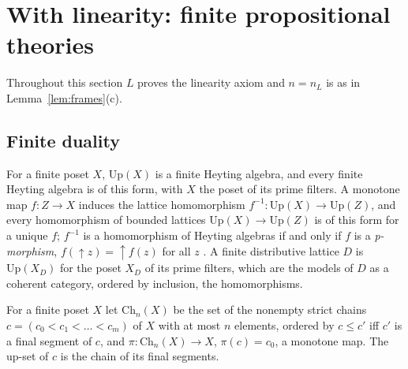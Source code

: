 \documentclass[11pt]{amsart}
\theoremstyle{definition}
\newcommand{\Up}{\mathrm{Up}}
\newcommand{\Ch}{\mathrm{Ch}}
\begin{document}
\section{With linearity: finite propositional theories}

Throughout this section $L$ proves the linearity axiom and $n=n_L$ is
as in Lemma~\ref{lem:frames}(c).

\subsection*{Finite duality}
For a finite poset $X$, $\Up(X)$ is a finite Heyting algebra, and every
finite Heyting algebra is of this form, with $X$ the poset of its
prime filters. A monotone map $f\colon Z\to X$ induces the lattice
homomorphism $f^{-1}\colon\Up(X)\to\Up(Z)$, and every homomorphism of
bounded lattices $\Up(X)\to\Up(Z)$ is of this form for a unique $f$;
$f^{-1}$ is a homomorphism of Heyting algebras if and only if $f$ is a
\emph{p-morphism}, $f(\uparrow\!z)=\uparrow\!f(z)$ for all $z$
\cite{CZ97}. A finite distributive lattice $D$ is $\Up(X_D)$ for the
poset $X_D$ of its prime filters, which are the models of $D$ as a
coherent category, ordered by inclusion, the homomorphisms.

For a finite poset $X$ let $\Ch_n(X)$ be the set of the nonempty
strict chains $c=(c_0<c_1<\dots<c_m)$ of $X$ with at most $n$ elements,
ordered by $c\le c'$ iff $c'$ is a final segment of $c$, and
$\pi\colon\Ch_n(X)\to X$, $\pi(c)=c_0$, a monotone map. The up-set of
$c$ is the chain of its final segments.
\end{document}
